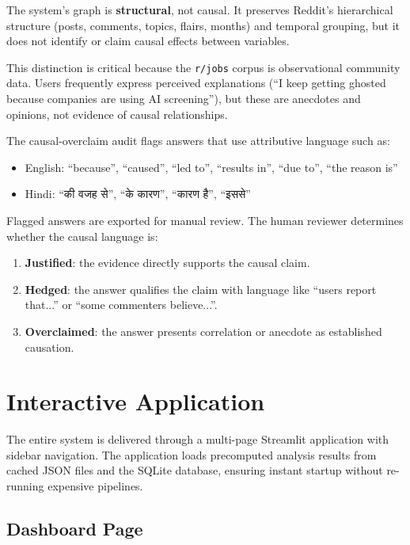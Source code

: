 \documentclass[11pt,a4paper]{article}
\begin{document}
The system's graph is \textbf{structural}, not causal. It preserves Reddit's hierarchical structure (posts, comments, topics, flairs, months) and temporal grouping, but it does not identify or claim causal effects between variables.

This distinction is critical because the \texttt{r/jobs} corpus is observational community data. Users frequently express perceived explanations (``I keep getting ghosted because companies are using AI screening''), but these are anecdotes and opinions, not evidence of causal relationships.

The causal-overclaim audit flags answers that use attributive language such as:
\begin{itemize}[leftmargin=*]
  \item English: ``because'', ``caused'', ``led to'', ``results in'', ``due to'', ``the reason is''
  \item Hindi: ``\texthindi{की वजह से}'', ``\texthindi{के कारण}'', ``\texthindi{कारण है}'', ``\texthindi{इससे}''
\end{itemize}

Flagged answers are exported for manual review. The human reviewer determines whether the causal language is:
\begin{enumerate}[leftmargin=*]
  \item \textbf{Justified}: the evidence directly supports the causal claim.
  \item \textbf{Hedged}: the answer qualifies the claim with language like ``users report that...'' or ``some commenters believe...''.
  \item \textbf{Overclaimed}: the answer presents correlation or anecdote as established causation.
\end{enumerate}


\section{Interactive Application}
\label{sec:app}

The entire system is delivered through a multi-page Streamlit application with sidebar navigation. The application loads precomputed analysis results from cached JSON files and the SQLite database, ensuring instant startup without re-running expensive pipelines.

\subsection{Dashboard Page}
\end{document}
